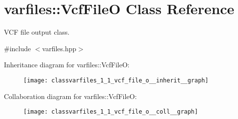 \hypertarget{classvarfiles_1_1_vcf_file_o}{}\section{varfiles\+:\+:Vcf\+FileO Class Reference}
\label{classvarfiles_1_1_vcf_file_o}


V\+CF file output class.  




{\ttfamily \#include $<$varfiles.\+hpp$>$}



Inheritance diagram for varfiles\+:\+:Vcf\+FileO\+:\nopagebreak
\begin{figure}[H]
\begin{center}
\leavevmode
\texttt{[image: classvarfiles\_1\_1\_vcf\_file\_o\_\_inherit\_\_graph]}
\end{center}
\end{figure}


Collaboration diagram for varfiles\+:\+:Vcf\+FileO\+:\nopagebreak
\begin{figure}[H]
\begin{center}
\leavevmode
\texttt{[image: classvarfiles\_1\_1\_vcf\_file\_o\_\_coll\_\_graph]}
\end{center}
\end{figure}
